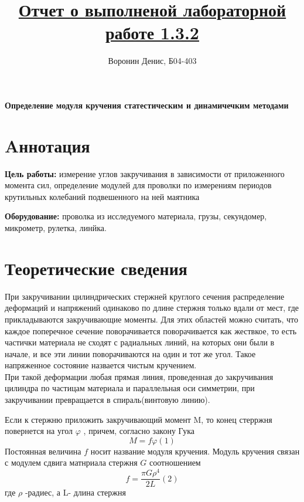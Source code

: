 \documentclass[a4paper]{article}
\title{\underline{Отчет о выполненой лабораторной работе 1.3.2}}
\author{Воронин Денис, Б04-403}
\begin{document}
\maketitle
\begin{center}
    \Large{\textbf{Определение модуля кручения статестическим и динамичечким методами}}
\end{center}


\section{Aннотация}
\textbf{Цель работы: }измерение углов закручивания в зависимости от приложенного момента
сил, определение модулей для проволки по измерениям периодов крутильных колебаний подвешенного на
ней маятника\par
\textbf{Оборудование: }проволка из исследуемого материала,
грузы, секундомер, микрометр, рулетка, линйка.
\section{Теоретические сведения}
При закручивании цилиндрических стержней круглого сечения распределение деформаций
 и напряжений одинаково по длине стержня только вдали от мест, где прикладываются закручивающие моменты.
Для этих областей можно считать, что каждое поперечное сечение поворачивается поворачивается как жествкое,
то есть частички материала не сходят с радиальных линий, на которых они были в начале, и все
эти линии поворачиваются на один и тот же угол. Такое напряженное состояние назвается чистым кручением.\\

При такой деформации любая прямая линия, проведенная до закручивания цилиндра по частицам материала и параллельная оси симметрии,
при закручивании превращается в спираль(винтовую линию).

Если к стержню приложить закручивающий момент M, то конец стерржня повернется на угол $\varphi$ , причем, согласно закону Гука
\[M= f\varphi (1)\]
Постоянная величина $f$ носит название модуля кручения. Модуль кручения связан с модулем сдвига матнриала стержня $G$ соотношением 
\[f = \frac{\pi G \rho^4}{2L}(2)\]
где $\rho $ -радиес, а L- длина стержня
\end{document}
